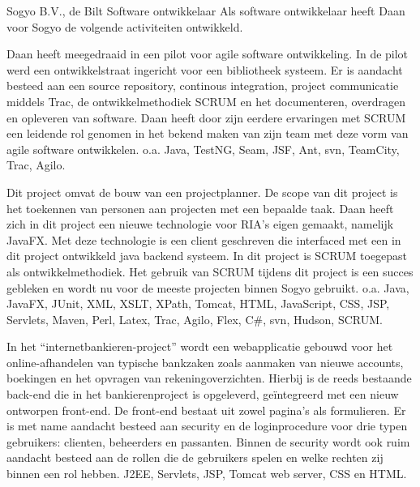 	\begin{workExperience}{Sogyo B.V., de Bilt}%
	{Software ontwikkelaar}{}
		Als software ontwikkelaar heeft Daan voor Sogyo de volgende
		activiteiten ontwikkeld.

		Daan heeft meegedraaid in een pilot voor agile software ontwikkeling. In
		de pilot werd een ontwikkelstraat ingericht voor een bibliotheek
		systeem. Er is aandacht besteed aan	een source repository, continous
		integration, project communicatie middels Trac, de ontwikkelmethodiek
		SCRUM en het documenteren, overdragen en opleveren van software.
		Daan heeft door zijn eerdere ervaringen met SCRUM een leidende rol
		genomen in het bekend maken van zijn team met deze vorm van agile
		software ontwikkelen.
		\technics o.a. Java, TestNG, Seam, JSF, Ant, svn, TeamCity, Trac, Agilo.

		Dit project omvat de bouw van een projectplanner. De scope van dit
		project is het toekennen van personen aan projecten met een bepaalde
		taak. Daan heeft zich in dit project een nieuwe technologie voor RIA's
		eigen gemaakt, namelijk JavaFX. Met deze technologie is een client
		geschreven die interfaced met een in dit project ontwikkeld java backend
		systeem. In dit project is SCRUM toegepast als ontwikkelmethodiek. Het
		gebruik van SCRUM tijdens dit project is een succes gebleken en wordt nu
		voor de meeste projecten binnen Sogyo gebruikt.
		\technics o.a. Java, JavaFX, JUnit, XML, XSLT, XPath, Tomcat, HTML,
		JavaScript, CSS, JSP, Servlets, Maven, Perl, Latex, Trac, Agilo, Flex,
		C\#, svn, Hudson, SCRUM.

		In het ``internetbankieren-project'' wordt een webapplicatie gebouwd voor
		het online-afhandelen van typische bankzaken zoals aanmaken van nieuwe
		accounts, boekingen en het opvragen van rekeningoverzichten. Hierbij is
		de reeds bestaande back-end die in het bankierenproject is opgeleverd,
		ge\"integreerd met een nieuw ontworpen front-end. De front-end bestaat uit
		zowel pagina's als formulieren. Er is met name aandacht besteed aan
		security en de loginprocedure voor drie typen gebruikers: clienten,
		beheerders en passanten. Binnen de security wordt ook ruim aandacht
		besteed aan de rollen die de gebruikers spelen en welke rechten zij
		binnen een rol hebben.
		\technics J2EE, Servlets, JSP, Tomcat web server, CSS en HTML.


\end{workExperience}
